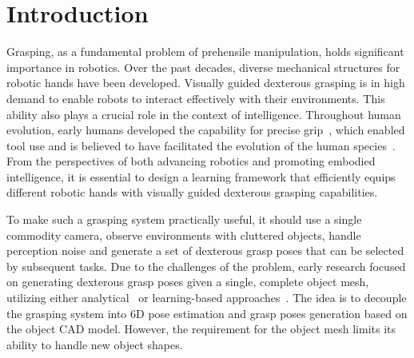 \section{Introduction}
Grasping, as a fundamental problem of prehensile manipulation, holds significant importance in robotics. Over the past decades, diverse mechanical structures for robotic hands have been developed. Visually guided dexterous grasping is in high demand to enable robots to interact effectively with their environments. This ability also plays a crucial role in the context of intelligence. Throughout human evolution, early humans developed the capability for precise grip~\cite{doi:10.1126/science.1261735}, which enabled tool use and is believed to have facilitated the evolution of the human species~\cite{almecija2010early, kivell2015evidence}. From the perspectives of both advancing robotics and promoting embodied intelligence, it is essential to design a learning framework that efficiently equips different robotic hands with visually guided dexterous grasping capabilities.

To make such a grasping system practically useful, it should use a single commodity camera, observe environments with cluttered objects, handle perception noise and generate a set of dexterous grasp poses that can be selected by subsequent tasks. Due to the challenges of the problem, early research focused on generating dexterous grasp poses given a single, complete object mesh, utilizing either analytical~\cite{miller2004graspit, rosales2011synthesizing, liu2021synthesizing, liu2020deep} or learning-based approaches~\cite{li2023gendexgrasp}. The idea is to decouple the grasping system into 6D pose estimation and grasp poses generation based on the object CAD model. However, the requirement for the object mesh limits its ability to handle new object shapes.

